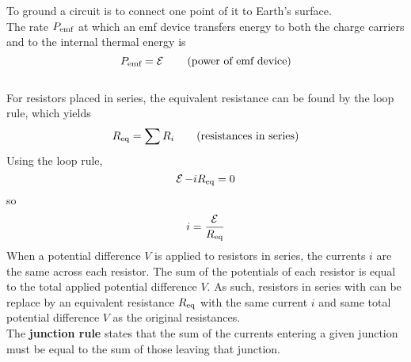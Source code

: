 \documentclass[./Electricity and Magnetism.tex]{subfiles}
\begin{document}
		To ground a circuit is to connect one point of it to Earth's surface. \\
		The rate \(P_{\text{emf}}\) at which an emf device transfers energy to both the charge carriers and to the internal thermal energy is
			\[P_{\text{emf}} = \operatorname{\mathcal{E}} \tag{power of emf device}\] \\
		For resistors placed in series, the equivalent resistance can be found by the loop rule, which yields
			\[R_{\text{eq}} = \sum R_i \tag{resistances in series}\]
			Using the loop rule,
			\[\operatorname{\mathcal{E}} - iR_{\text{eq}} = 0\]
			so
			\[i = \frac{\operatorname{\mathcal{E}}}{R_{\text{eq}}}\]
			When a potential difference \(V\) is applied to resistors in series, the currents \(i\) are the same across each resistor. The sum of the potentials of each resistor is equal to the total applied potential difference \(V\). As such, resistors in series with can be replace by an equivalent resistance \(R_{\text{eq}}\) with the same current \(i\) and same total potential difference \(V\) as the original resistances. \\
		The \textbf{junction rule} states that the sum of the currents entering a given junction must be equal to the sum of those leaving that junction. \\
		
\end{document}
